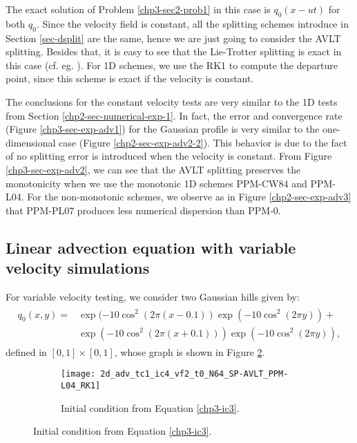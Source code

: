The  exact solution of Problem \ref{chp3-sec2-prob1} in this case
is $q_0(x-ut)$ for both $q_0$. 
Since the velocity field is constant, all the splitting schemes introduce in
Section \ref{sec-dsplit} are the same, hence we are just going to consider the AVLT
splitting. Besides that, it is easy to see that the Lie-Trotter splitting is exact in this case
(cf. eg. \cite[p.~ 202-203]{leveque:1990}).
For 1D schemes, we use the RK1 to compute the departure point,
since this scheme is exact if the velocity is constant. 

The conclusions for the constant velocity tests are very similar to the 1D tests from Section \ref{chp2-sec-numerical-exp-1}.
In fact, the error and convergence rate (Figure \ref{chp3-sec-exp-adv1}) for the Gaussian
profile is very similar to the one-dimensional case (Figure \ref{chp2-sec-exp-adv2-2}). This behavior is due to the fact of 
no splitting error is introduced when the velocity is constant. From 
Figure \ref{chp3-sec-exp-adv2}, we can see that the AVLT splitting preserves the monotonicity
when we use the monotonic 1D schemes PPM-CW84 and PPM-L04. For the non-monotonic schemes, we 
observe as in Figure \ref{chp2-sec-exp-adv3} that PPM-PL07 produces less numerical dispersion than PPM-0.

\subsection{Linear advection equation with variable velocity simulations}
For variable velocity testing, we consider two Gaussian hills given by:
\begin{align}
	\begin{split}
	\label{chp3-ic3}
	q_0(x,y) = &\exp(-10\cos^2 (2\pi (x-0.1))\exp(-10\cos^2 (2\pi y)) + \\
			   &\exp(-10\cos^2 (2\pi (x+0.1))) \exp(-10\cos^2 (2\pi y)),
	\end{split}
\end{align}
defined in $[0,1] \times [0,1]$, whose graph is shown in Figure \ref{chp3-sec-exp-adv3-ic}.
\begin{figure}[!htb]
	\begin{subfigure}{0.45\textwidth}
		\centering
		\texttt{[image: 2d\_adv\_tc1\_ic4\_vf2\_t0\_N64\_SP-AVLT\_PPM-L04\_RK1]}
		\caption{Initial condition from Equation \eqref{chp3-ic3}.\label{chp3-sec-exp-adv3-ic}}
	\end{subfigure} 
\end{figure}

